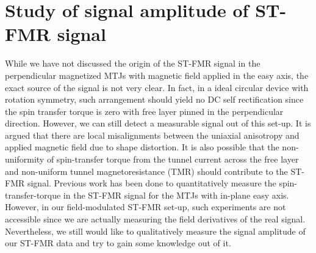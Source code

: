 \section{Study of signal amplitude of ST-FMR signal}

While we have not discussed the origin of the ST-FMR signal in the perpendicular magnetized MTJs with magnetic field applied in the easy axis, the exact source of the signal is not very clear. In fact, in a ideal circular device with rotation symmetry, such arrangement should yield no DC self rectification since the spin transfer torque is zero with free layer pinned in the perpendicular direction. However, we can still detect a measurable signal out of this set-up. It is argued that there are local misalignments between the uniaxial anisotropy and applied magnetic field due to shape distortion\cite{chris}. It is also possible that the non-uniformity of spin-transfer torque from the tunnel current across the free layer and non-uniform  tunnel magnetoresistance (TMR) should contribute to the ST-FMR signal. Previous work has been done to quantitatively measure the spin-transfer-torque in the ST-FMR signal\cite{Sankey2008}\cite{Kubota2007} for the MTJs with in-plane easy axis. However, in our field-modulated ST-FMR set-up, such experiments are not accessible since we are actually measuring the field derivatives of the real signal. Nevertheless, we still would like to qualitatively measure the signal amplitude of our ST-FMR data and try to gain some knowledge out of it.


